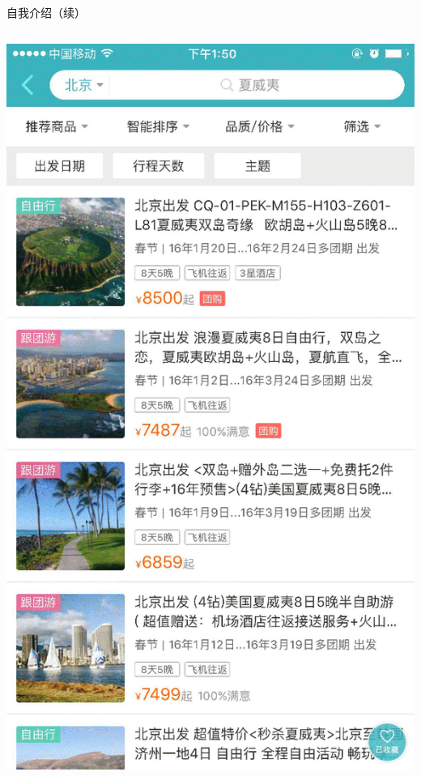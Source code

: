 \documentclass{beamer}
\begin{document}
\begin{CJK}{UTF8}{gbsn}
\begin{frame}{自我介绍（续）}
\begin{columns}
    \includegraphics[scale=0.2]{./images/mobile-search-screenshot}
  \end{columns}
\end{frame}


\end{CJK}
\end{document}
